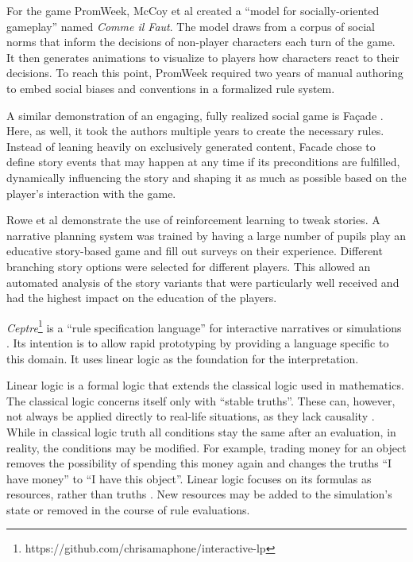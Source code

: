 For the game PromWeek, McCoy et al \cite{mccoy_2013, McCoy:2011:CIF:3014589.3014617} created a \enquote{model for socially-oriented gameplay} named \emph{Comme il Faut}.
The model draws from a corpus of social norms that inform the decisions of non-player characters each turn of the game.
It then generates animations to visualize to players how characters react to their decisions.
To reach this point, PromWeek required two years of manual authoring to embed social biases and conventions in a formalized rule system.

A similar demonstration of an engaging, fully realized social game is Fa\c{c}ade \cite{Mateas_2003}.
Here, as well, it took the authors multiple years to create the necessary rules.
Instead of leaning heavily on exclusively generated content, Facade chose to define story events that may happen at any time if its preconditions are fulfilled, dynamically influencing the story and shaping it as much as possible based on the player's interaction with the game.

Rowe et al \cite{rowe_2014} demonstrate the use of reinforcement learning to tweak stories.
A narrative planning system was trained by having a large number of pupils play an educative story-based game and fill out surveys on their experience.
Different branching story options were selected for different players.
This allowed an automated analysis of the story variants that were particularly well received and had the highest impact on the education of the players.

\emph{Ceptre}\footnote{https://github.com/chrisamaphone/interactive-lp} is a \enquote{rule specification language} for interactive narratives or simulations \cite{martens_2015}.
Its intention is to allow rapid prototyping by providing a language specific to this domain.
It uses linear logic as the foundation for the interpretation.

Linear logic is a formal logic that extends the classical logic used in mathematics.
The classical logic concerns itself only with \enquote{stable truths}.
These can, however, not always be applied directly to real-life situations, as they lack causality \cite{girard_1995}.
While in classical logic truth all conditions stay the same after an evaluation, in reality, the conditions may be modified.
For example, trading money for an object removes the possibility of spending this money again and changes the truths \enquote{I have money} to \enquote{I have this object}.
Linear logic focuses on its formulas as resources, rather than truths \cite{sep-logic-linear}.
New resources may be added to the simulation's state or removed in the course of rule evaluations.


